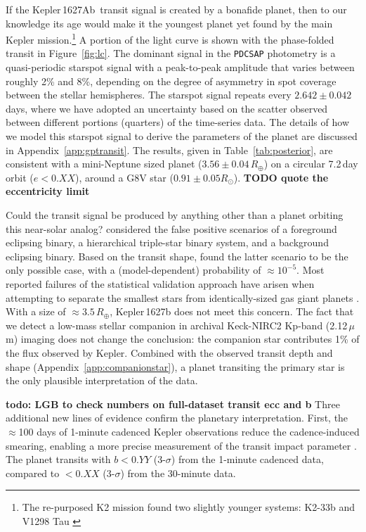 \documentclass[12pt,modern,twocolumn,tighten]{aastex63}
\newcommand{\pn}{Kepler\,1627Ab} %
\begin{document}

If the \pn\ transit signal is created by a bonafide planet,  then to
our knowledge its age would make it the youngest planet yet found by
the main Kepler mission.\footnote{The re-purposed K2 mission found two
slightly younger systems: K2-33b
\citep{David_et_al_2017,Mann_K2_33b_2016} and V1298 Tau
\citep{david_four_2019}}  A portion of the light curve is shown with
the phase-folded transit in Figure~\ref{fig:lc}.  The dominant signal
in the \texttt{PDCSAP} photometry is a quasi-periodic starspot signal
with a peak-to-peak amplitude that varies between roughly 2\% and 8\%,
depending on the degree of asymmetry in spot coverage between the
stellar hemispheres.  The starspot signal repeats every
$2.642\pm0.042$\,days, where we have adopted an uncertainty based on
the scatter observed between different portions (quarters) of the
time-series data.  The details of how we model this starspot signal to
derive the parameters of the planet are discussed in
Appendix~\ref{app:gptransit}.  The results, given in
Table~\ref{tab:posterior}, are consistent with a mini-Neptune sized
planet ($3.56\pm 0.04\,R_\oplus$) on a circular 7.2\,day orbit
($e<0.XX$), around a G8V star ($0.91 \pm 0.05 R_\odot$).  {\bf TODO
quote the eccentricity limit}

Could the transit signal be produced by anything other than a planet
orbiting this near-solar analog?  \citet{morton_false_2016} considered
the false positive scenarios of a foreground eclipsing binary, a
hierarchical triple-star binary system, and a background eclipsing
binary.  Based on the transit shape, \citet{morton_false_2016} found
the latter scenario to be the only possible case, with a
(model-dependent) probability of $\approx10^{-5}$. Most
reported failures of the statistical validation approach have arisen when attempting
to separate the smallest stars from identically-sized gas giant
planets \citep[{\it e.g.},][]{shporer_three_2017}.  With a size of
$\approx 3.5\,R_\oplus$, Kepler\,1627b does not meet this concern.
The fact that we detect a low-mass stellar companion in archival
Keck-NIRC2 Kp-band (2.12\,$\mu $m) imaging does not change the
conclusion: the companion star contributes 1\% of the flux observed by
Kepler.  Combined with the observed transit depth and shape
(Appendix~\ref{app:companionstar}), a planet transiting the primary
star is the only plausible interpretation of the data.

{\bf todo: LGB to check numbers on full-dataset transit ecc and b} 
Three additional new lines of evidence confirm the planetary
interpretation.  First, the $\approx$100 days of 1-minute
cadenced Kepler observations reduce the cadence-induced smearing,
enabling a more precise measurement of the transit impact parameter
\citep{kipping_binning_2010}.  The planet transits with $b<0.YY$
(3-$\sigma$) from the 1-minute cadenced data, compared to $<0.XX$
(3-$\sigma$) from the 30-minute data.
\end{document}
